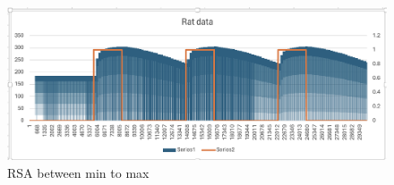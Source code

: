 \documentclass[conference]{IEEEtran}
\begin{document}
\begin{figure}[htbp]
	\centerline{\includegraphics[scale=0.5]{./fig/result_rat.png}}
	\caption{RSA between min to max}
	\label{lif}
\end{figure}
\end{document}
